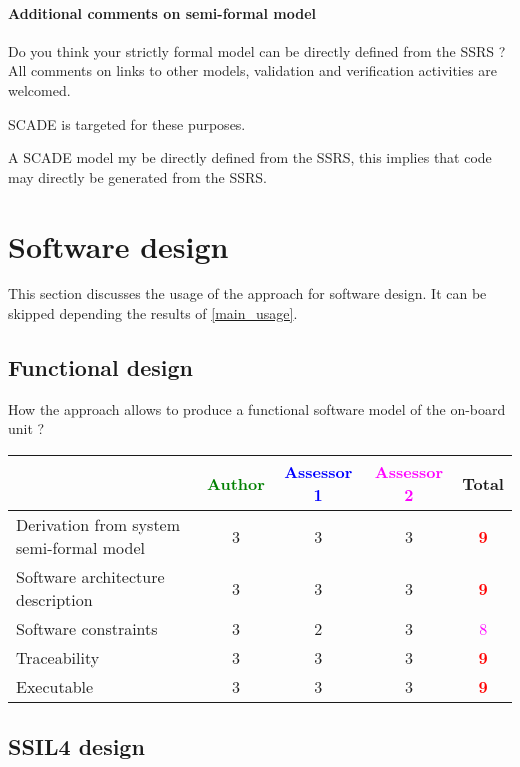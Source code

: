 \paragraph{Additional comments on semi-formal  model} Do you think your strictly formal  model can be directly defined from the SSRS ?
All comments on links to  other models, validation and verification activities are welcomed.

\begin{author_comment}
SCADE is targeted for these purposes.   
\end{author_comment}
\begin{assessor2}
A SCADE model my be directly defined from the SSRS, this implies that
code may directly be generated from the SSRS.
\end{assessor2}


\section{Software design}
This section discusses the usage of the approach for software design.
It can be skipped depending the results of \ref{main_usage}.

\subsection{Functional design}

How the approach allows to  produce a functional software model of the on-board unit ?

\begin{tabular}{|l | c | c | c | c|}
\hline
& \textcolor{green}{Author} & \textcolor{blue}{Assessor 1} & \textcolor{magenta}{Assessor 2} & Total \\
\hline
Derivation from system semi-formal model  & 3    & 3    &3 & \textcolor{red}{\textbf{9}} \\
\hline 
Software architecture description  & 3    & 3    &3 & \textcolor{red}{\textbf{9}} \\
\hline
Software constraints  & 3    & 2    &3 & \textcolor{magenta}{8} \\
\hline
Traceability  & 3    & 3    &3 & \textcolor{red}{\textbf{9}} \\
\hline
Executable  & 3    & 3    &3 & \textcolor{red}{\textbf{9}} \\
\hline
\end{tabular}

\subsection{SSIL4 design}

